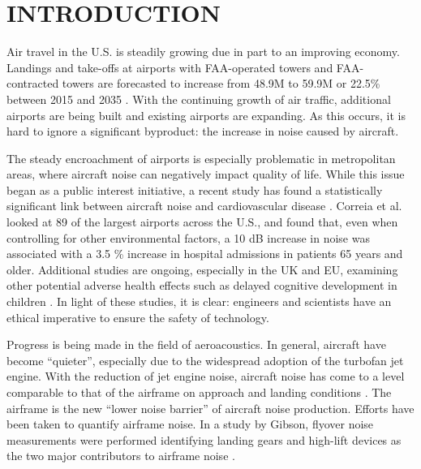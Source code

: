 %
%
%
%
%
%
%
%
%
%


%
%

\chapter{INTRODUCTION}
Air travel in the U.S. is steadily growing due in part to an improving economy. Landings and take-offs at airports with FAA-operated towers and FAA-contracted towers are forecasted to increase from 48.9M to 59.9M or 22.5\% between 2015 and 2035 \cite{faa2015}. With the continuing growth of air traffic, additional airports are being built and existing airports are expanding. As this occurs, it is hard to ignore a significant byproduct: the increase in noise caused by aircraft.

The steady encroachment of airports is especially problematic in metropolitan areas, where aircraft noise can negatively impact quality of life. While this issue began as a public interest initiative, a recent study has found a statistically significant link between aircraft noise and cardiovascular disease \cite{correia2013}. Correia et al. looked at 89 of the largest airports across the U.S., and found that, even when controlling for other environmental factors, a 10 dB increase in noise was associated with a 3.5 \% increase in hospital admissions in patients 65 years and older. Additional studies are ongoing, especially in the UK and EU, examining other potential adverse health effects such as delayed cognitive development in children \cite{cap2014}. In light of these studies, it is clear: engineers and scientists have an ethical imperative to ensure the safety of technology. 

Progress is being made in the field of aeroacoustics. In general, aircraft have become ``quieter'', especially due to the widespread adoption of the turbofan jet engine. With the reduction of jet engine noise, aircraft noise has come to a level comparable to that of the airframe on approach and landing conditions \cite{dob2010}. The airframe is the new ``lower noise barrier'' of aircraft noise production. Efforts have been taken to quantify airframe noise. In a study by Gibson, flyover noise measurements were performed identifying landing gears and high-lift devices as the two major contributors to airframe noise \cite{gibson1974}.

